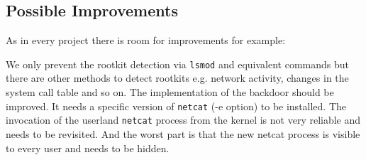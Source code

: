 \documentclass[12pt]{article}
\newcommand{\shellcmdinline}[1]{\texttt{\footnotesize #1}}
\begin{document}
\label{sec:conc}
\subsection{Possible Improvements}
As in every project there is room for improvements for example:

We only prevent the rootkit detection via \shellcmdinline{lsmod} and equivalent commands but there are other methods to detect rootkits e.g. network activity, changes in the system call table and so on. The implementation of the backdoor should be improved. It needs a specific version of \shellcmdinline{netcat} (-e option) to be installed. The invocation of the userland \shellcmdinline{netcat} process from the kernel is not very reliable and needs to be revisited. And the worst part is that the new netcat process is visible to every user and needs to be hidden.  
\end{document}
